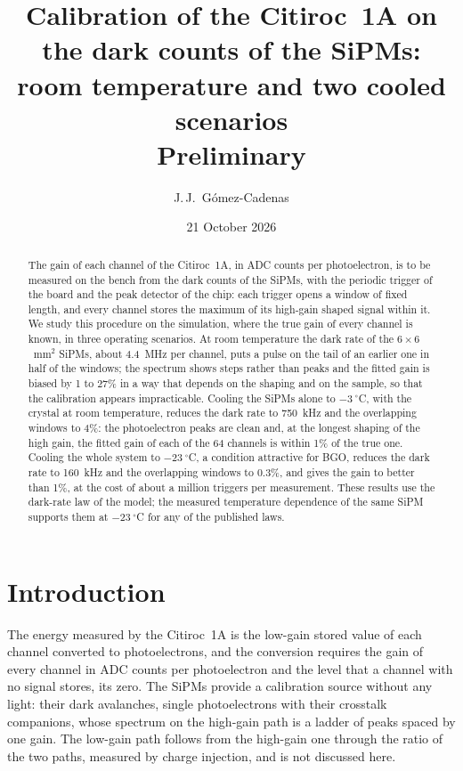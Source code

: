 \documentclass[11pt]{article}
\title{Calibration of the Citiroc~1A on the dark counts of the SiPMs:\\
room temperature and two cooled scenarios\\[4pt]
\large Preliminary}
\author{J.\,J.~Gómez-Cadenas}
\date{21 October 2026}
\begin{document}
\maketitle

\begin{abstract}
The gain of each channel of the Citiroc~1A, in ADC counts per
photoelectron, is to be measured on the bench from the dark counts of the
SiPMs, with the periodic trigger of the board and the peak detector of the
chip: each trigger opens a window of fixed length, and every channel stores
the maximum of its high-gain shaped signal within it. We study this
procedure on the simulation, where the true gain of every channel is
known, in three operating scenarios. At room temperature the dark rate of
the $6 \times 6$~mm$^2$ SiPMs, about 4.4~MHz per channel, puts a pulse on
the tail of an earlier one in half of the windows; the spectrum shows
steps rather than peaks and the fitted gain is biased by 1 to 27\% in a way
that depends on the shaping and on the sample, so that the calibration
appears impracticable. Cooling the SiPMs alone to $-3~^\circ$C, with the
crystal at room temperature, reduces the dark rate to 750~kHz and the
overlapping windows to 4\%: the photoelectron peaks are clean and, at the
longest shaping of the high gain, the fitted gain of each of the 64
channels is within 1\% of the true one. Cooling the whole system to $-23~^\circ$C, a condition attractive for
BGO, reduces the dark rate to 160~kHz and the overlapping windows to
0.3\%, and gives the gain to better than 1\%, at the cost of about a
million triggers per measurement. These results use the dark-rate law of
the model; the measured temperature dependence of the same SiPM supports
them at $-23~^\circ$C for any of the published laws.
\end{abstract}

\tableofcontents

\section{Introduction}

The energy measured by the Citiroc~1A is the low-gain stored value of each
channel converted to photoelectrons, and the conversion requires the gain
of every channel in ADC counts per photoelectron and the level that a
channel with no signal stores, its zero. The SiPMs provide a calibration
source without any light: their dark avalanches, single photoelectrons
with their crosstalk companions, whose spectrum on the high-gain path is a
ladder of peaks spaced by one gain. The low-gain path follows from the
high-gain one through the ratio of the two paths, measured by charge
injection, and is not discussed here.
\end{document}
